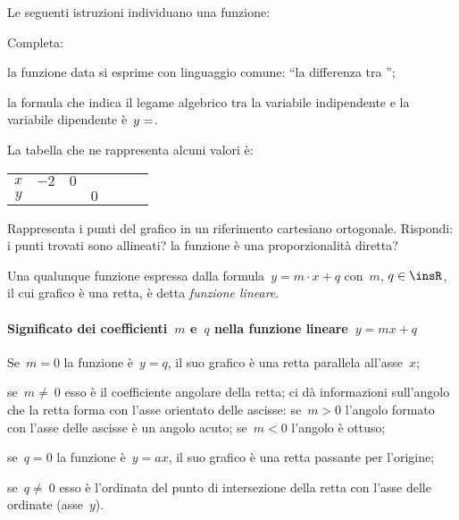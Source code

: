 Le seguenti istruzioni individuano una funzione:
\begin{center}
 
\end{center}

Completa:
\begin{itemize*}
\item la funzione data si esprime con linguaggio comune: ``la differenza tra \dotfill'';
\item la formula che indica il legame algebrico tra la variabile indipendente e la variabile dipendente è~$y=\dotfill$.
\end{itemize*}
La tabella che ne rappresenta alcuni valori è:
\begin{center}
 \begin{tabular}{ccccccc}
 \toprule
 $x$ & $-2$ & $0$ & & & & \\
 $y$ & & & $0$ & & & \\
 \bottomrule
 \end{tabular}
\end{center}
Rappresenta i punti del grafico in un riferimento cartesiano ortogonale.
Rispondi: i punti trovati sono allineati? la funzione è una proporzionalità diretta?

\begin{definizione}
Una qualunque funzione espressa dalla formula~$y=m\cdot x+q$ con~$m$, $q\in \insR$, il cui grafico è una retta, è detta
\emph{funzione lineare}.
\end{definizione}

\paragraph{Significato dei coefficienti~$m$ e~$q$ nella funzione lineare~$y = mx+q$}

\begin{itemize*}
 \item Se~$m=0$ la funzione è~$y=q$, il suo grafico è una retta parallela all'asse~$x$;
 \item se~$m\neq~0$ esso è il coefficiente angolare della retta; ci dà informazioni sull'angolo che la retta
 forma con l'asse orientato delle ascisse: se~$m>0$ l'angolo formato con l'asse delle ascisse è un angolo acuto; se~$m<0$ l'angolo è ottuso;
 \item se~$q=0$ la funzione è~$y=ax$, il suo grafico è una retta passante per l'origine;
 \item se~$q\neq~0$ esso è l'ordinata del punto di intersezione della retta con l'asse delle ordinate (asse~$y$).
\end{itemize*}
\begin{center}
 
\end{center}

